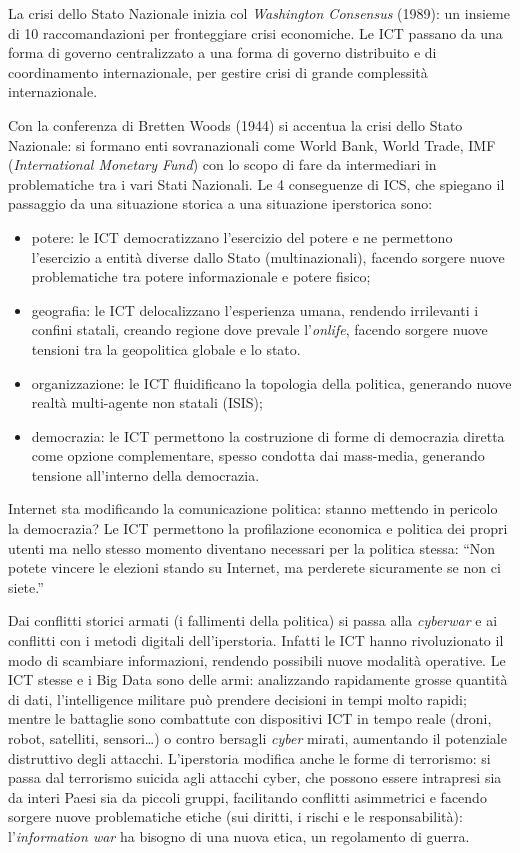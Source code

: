 \documentclass[a4page, 11pt]{article}
\begin{document}
La crisi dello Stato Nazionale inizia col \textit{Washington Consensus} (1989): un insieme di 10 raccomandazioni per fronteggiare crisi economiche.
Le ICT passano da una forma di governo centralizzato a una forma di governo distribuito e di coordinamento internazionale, per gestire crisi di grande complessità internazionale.

Con la conferenza di Bretten Woods (1944) si accentua la crisi dello Stato Nazionale: si formano enti sovranazionali come World Bank, World Trade, IMF (\textit{International Monetary Fund}) con lo scopo di fare da intermediari in problematiche tra i vari Stati Nazionali.
Le 4 conseguenze di ICS, che spiegano il passaggio da una situazione storica a una situazione iperstorica sono:
\begin{itemize}
  \item potere: le ICT democratizzano l'esercizio del potere e ne permettono l'esercizio a entità diverse dallo Stato (multinazionali), facendo sorgere nuove problematiche tra potere informazionale e potere fisico;
  \item geografia: le ICT delocalizzano l'esperienza umana, rendendo irrilevanti i confini statali, creando regione dove prevale l'\textit{onlife}, facendo sorgere nuove tensioni tra la geopolitica globale e lo stato.
  \item organizzazione: le ICT fluidificano la topologia della politica, generando nuove realtà multi-agente non statali (ISIS);
  \item democrazia: le ICT permettono la costruzione di forme di democrazia diretta come opzione complementare, spesso condotta dai mass-media, generando tensione all'interno della democrazia.
\end{itemize}

Internet sta modificando la comunicazione politica: stanno mettendo in pericolo la democrazia?
Le ICT permettono la profilazione economica e politica dei propri utenti ma nello stesso momento diventano necessari per la politica stessa: ``Non potete vincere le elezioni stando su Internet, ma perderete sicuramente se non ci siete.''

Dai conflitti storici  armati (i fallimenti della politica) si passa alla \textit{cyberwar} e ai conflitti con i metodi digitali dell'iperstoria.
Infatti le ICT hanno rivoluzionato il modo di scambiare informazioni, rendendo possibili nuove modalità operative.
Le ICT stesse e i Big Data sono delle armi: analizzando rapidamente grosse quantità di dati, l'intelligence militare può prendere decisioni in tempi molto rapidi; mentre le battaglie sono combattute con dispositivi ICT in tempo reale (droni, robot, satelliti, sensori\ldots) o contro bersagli \textit{cyber} mirati, aumentando il potenziale distruttivo degli attacchi.
L'iperstoria modifica anche le forme di terrorismo: si passa dal terrorismo suicida agli attacchi cyber, che possono essere intrapresi sia da interi Paesi sia da piccoli gruppi, facilitando conflitti asimmetrici e facendo sorgere nuove problematiche etiche (sui diritti, i rischi e le responsabilità): l'\textit{information war} ha bisogno di una nuova etica, un regolamento di guerra. \newline
\end{document}
